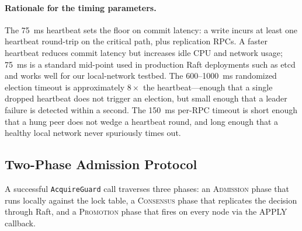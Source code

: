 \documentclass[sigconf]{acmart}
\begin{document}
\paragraph{\textbf{Rationale for the timing parameters.}}
The 75~ms heartbeat sets the floor on commit latency: a write incurs at
least one heartbeat round-trip on the critical path, plus replication
RPCs. A faster heartbeat reduces commit latency but increases idle CPU
and network usage; 75~ms is a standard mid-point used in production Raft
deployments such as etcd and works well for our local-network
testbed. The 600--1000~ms randomized election timeout is approximately
$8\times$ the heartbeat---enough that a single dropped heartbeat does not
trigger an election, but small enough that a leader failure is detected
within a second. The 150~ms per-RPC timeout is short enough that a
hung peer does not wedge a heartbeat round, and long enough that a healthy
local network never spuriously times out.

\subsection{Two-Phase Admission Protocol}
\label{sec:two-phase}

A successful \texttt{AcquireGuard} call traverses three phases: an
\textsc{Admission} phase that runs locally against the lock table, a
\textsc{Consensus} phase that replicates the decision through Raft, and a
\textsc{Promotion} phase that fires on every node via the APPLY callback.

\end{document}
